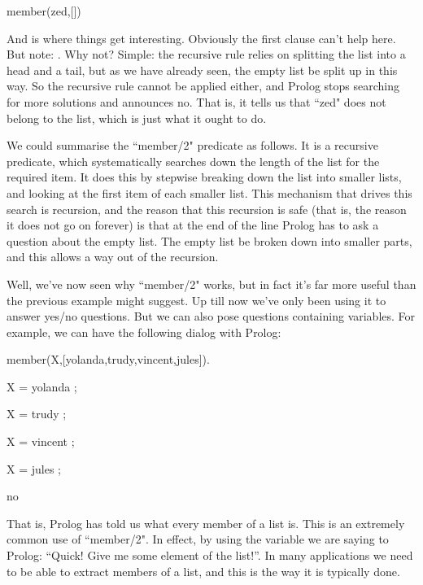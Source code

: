\begin{LPNcodedisplay}
member(zed,[])
\end{LPNcodedisplay}
And  is where things get interesting.  Obviously the
first clause can't help here.  But note: .  Why not? Simple: the recursive rule
relies on splitting the list into a head and a tail, but as we have
already seen, the empty list  be split up in this way.
So the recursive rule cannot be applied either, and Prolog stops
searching for more solutions and announces no.  That is, it tells us
that ``zed" does not belong to the list, which is just what it ought to
do.

We could summarise the ``member/2" predicate as follows.  It
is a recursive predicate, which systematically searches down the
length of the list for the required item.  It does this by stepwise
breaking down the list into smaller lists, and looking at the first
item of each smaller list.  This mechanism that drives this
search is recursion, and the reason that this recursion is safe (that
is, the reason it does not go on forever) is that at the end of the
line Prolog has to ask a question about the empty list.  The empty
list  be broken down into smaller parts, and this allows a
way out of the recursion.

Well, we've now seen why ``member/2" works, but in fact it's
far more useful than the previous example might suggest.  Up till now
we've only been using it to answer yes/no questions.  But we can also
pose questions containing variables.  For example, we can have the
following dialog with Prolog:


\begin{LPNcodedisplay}
member(X,[yolanda,trudy,vincent,jules]).

X = yolanda ;

X = trudy ;

X = vincent ;

X = jules ;

no
\end{LPNcodedisplay}


That is, Prolog has told us what every member of a list is.  This is
an extremely common use of ``member/2". In effect, by using the
variable we are saying to Prolog: ``Quick! Give me some element of the
list!''. In many applications we need to be able to extract members of
a list, and this is the way it is typically done.




